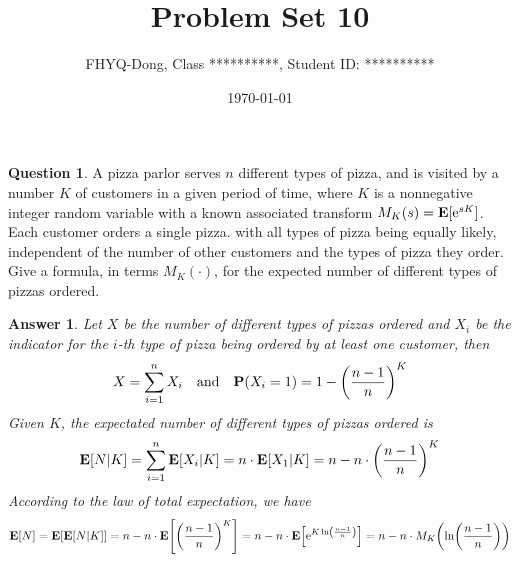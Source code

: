 \documentclass[utf8]{article}
\title{Problem Set 10}
\author{ FHYQ-Dong, Class **********, Student ID: ********** }
\date{\today}
\theoremstyle{definition}%
\newtheorem{question}{Question} %
\theoremstyle{plain}%
\newtheorem{answer}{Answer} %
\begin{document}
\maketitle
\thispagestyle{fancy}

\begin{question}
A pizza parlor serves $n$ different types of pizza, and is visited by a number $K$ of customers in a given period of time, where $K$ is a nonnegative integer random variable with a known associated transform $M_K(s) = \mathbf{E}[\mathrm{e}^{sK}]$. Each customer orders a single pizza. with all types of pizza being equally likely, independent of the number of other customers and the types of pizza they order. Give a formula, in terms $M_K(\cdot)$, for the expected number of different types of pizzas ordered.
\end{question}
\begin{answer}
    Let $X$ be the number of different types of pizzas ordered and $X_i$ be the indicator for the $i$-th type of pizza being ordered by at least one customer, then
    \begin{equation}
        X = \sum_{i=1}^n X_i \quad \text{and} \quad \mathbf{P}(X_i = 1) = 1 - \qty(\frac{n - 1}{n})^K
    \end{equation}
    Given $K$, the expectated number of different types of pizzas ordered is
    \begin{equation}
        \mathbf{E}[N |K] = \sum_{i=1}^n \mathbf{E}[X_i | K] = n \cdot \mathbf{E}[X_1 | K] = n - n \cdot \qty(\frac{n - 1}{n})^K
    \end{equation}
    According to the law of total expectation, we have
    \begin{equation}
        \mathbf{E}[N] = \mathbf{E}[\mathbf{E}[N | K]] = n - n \cdot \mathbf{E}\qty[\qty(\frac{n - 1}{n})^K] = n - n \cdot \mathbf{E}\qty[\mathrm{e}^{K \ln(\frac{n - 1}{n})}] = n - n \cdot M_K\qty(\ln(\frac{n - 1}{n}))
    \end{equation}
\end{answer}
\end{document}
